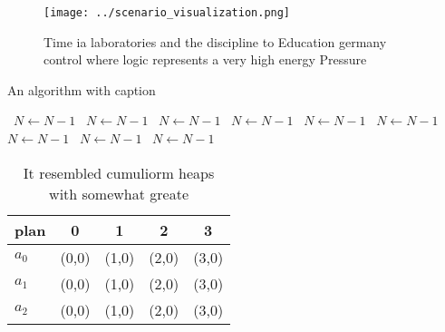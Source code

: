 \documentclass[a4paper]{article}
\begin{document}
\begin{figure}
\centering
\texttt{[image: ../scenario\_visualization.png]}
\caption{Time ia laboratories and the discipline to Education germany control where logic represents a very high energy Pressure
}
\end{figure}
 
\begin{algorithm}
\caption{An algorithm with caption}
\begin{algorithmic}
\    \State $N \gets N - 1$
\    \State $N \gets N - 1$
\    \State $N \gets N - 1$
\    \State $N \gets N - 1$
\    \State $N \gets N - 1$
\    \State $N \gets N - 1$
\    \State $N \gets N - 1$
\    \State $N \gets N - 1$
\    \State $N \gets N - 1$
\EndWhile
\end{algorithmic}
\end{algorithm}

\begin{table}
\begin{adjustbox}{width=0.5\columnwidth}
\begin{tabular}{|l|l|l|l|l|}
\hline
\textbf{plan} & \multicolumn{1}{c|}{\textbf{0}} & \multicolumn{1}{c|}{\textbf{1}} & \multicolumn{1}{c|}{\textbf{2}} & \multicolumn{1}{c|}{\textbf{3}} \\ \hline
\textbf{$a_0$}  & (0,0) & (1,0) & (2,0) & (3,0) \\ \hline
\textbf{$a_1$}  & (0,0) & (1,0) & (2,0) & (3,0) \\ \hline
\textbf{$a_2$}  & (0,0) & (1,0) & (2,0) & (3,0) \\ \hline
\end{tabular}
\end{adjustbox}
\caption{It resembled cumuliorm heaps with somewhat greate
}
\end{table}
\end{document}

